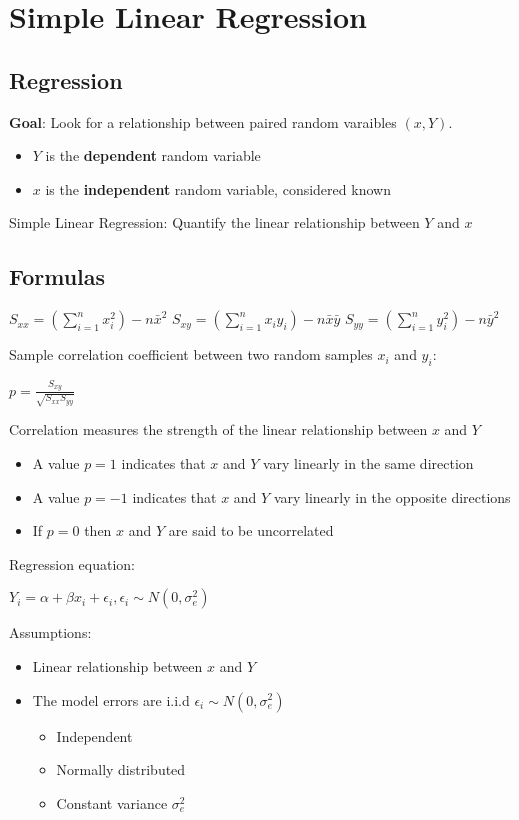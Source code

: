 \chapter{Simple Linear Regression}
  \section{Regression}
    \textbf{Goal}: Look for a relationship between paired random varaibles $(x, Y)$.
    \begin{itemize}
      \item $Y$ is the \textbf{dependent} random variable
      \item $x$ is the \textbf{independent} random variable, considered known
    \end{itemize}
    Simple Linear Regression: Quantify the linear relationship between $Y$ and $x$
  \section{Formulas}
    $ S_{xx} = (\sum_{i=1}^{n} x^2_i) - n\bar{x}^2 $
    $ S_{xy} = (\sum_{i=1}^{n} x_iy_i) - n\bar{x}\bar{y} $
    $ S_{yy} = (\sum_{i=1}^{n} y^2_i) - n\bar{y}^2 $

    Sample correlation coefficient between two random samples $x_i$ and $y_i$:
    \begin{center}$ p = \frac{ S_{xy} }{ \sqrt{S_{xx}S_{yy}} } $\end{center}
    Correlation measures the strength of the linear relationship between $x$ and $Y$
    \begin{itemize}
      \item A value $p = 1$ indicates that $x$ and $Y$ vary linearly in the same direction
      \item A value $p = -1$ indicates that $x$ and $Y$ vary linearly in the opposite directions
      \item If $p = 0$ then $x$ and $Y$ are said to be uncorrelated
    \end{itemize}

    Regression equation:
    \begin{center}$ Y_i = \alpha + \beta x_i + \epsilon_i, \epsilon_i \sim N(0, \sigma^2_e)$\end{center}
    Assumptions:
    \begin{itemize}
      \item  Linear relationship between $x$ and $Y$
      \item The model errors are i.i.d $\epsilon_i \sim N(0, \sigma^2_e)$
      \begin{itemize}
        \item Independent
        \item Normally distributed
        \item Constant variance $\sigma^2_e$
      \end{itemize}
    \end{itemize}

